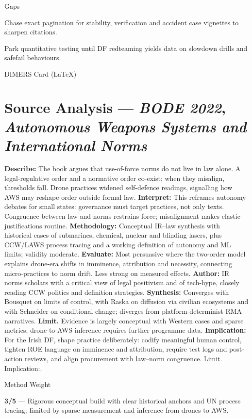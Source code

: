 Gaps

Chase exact pagination for stability, verification and accident case vignettes to sharpen citations.

Park quantitative testing until DF red\textendash teaming yields data on slow\textendash down drills and safe\textendash fail behaviours.

\parencite{BODE_2022}

DIMERS Card (LaTeX)

\section*{Source Analysis — \textit{BODE 2022}, \textit{Autonomous Weapons Systems and International Norms}}
\textbf{Describe:} The book argues that use-of-force norms do not live in law alone. A legal-regulative order and a normative order co-exist; when they misalign, thresholds fall. Drone practices widened self-defence readings, signalling how AWS may reshape order outside formal law.
\textbf{Interpret:} This reframes autonomy debates for small states: governance must target practices, not only texts. Congruence between law and norms restrains force; misalignment makes elastic justifications routine.
\textbf{Methodology:} Conceptual IR–law synthesis with historical cases of submarines, chemical, nuclear and blinding lasers, plus CCW/LAWS process tracing and a working definition of autonomy and ML limits; validity moderate.
\textbf{Evaluate:} Most persuasive where the two-order model explains drone-era shifts in imminence, attribution and necessity, connecting micro-practices to norm drift. Less strong on measured effects.
\textbf{Author:} IR norms scholars with a critical view of legal positivism and of tech-hype, closely reading CCW politics and definition strategies.
\textbf{Synthesis:} Converges with Bousquet on limits of control, with Raska on diffusion via civilian ecosystems and with Schneider on conditional change; diverges from platform-determinist RMA narratives.
\textbf{Limit.} Evidence is largely conceptual with Western cases and sparse metrics; drone-to-AWS inference requires further programme data.
\textbf{Implication:} For the Irish DF, shape practice deliberately: codify meaningful human control, tighten ROE language on imminence and attribution, require test logs and post-action reviews, and align procurement with law–norm congruence. Limit. Implication:.

Method Weight

\textbf{3/5} — Rigorous conceptual build with clear historical anchors and UN process tracing; limited by sparse measurement and inference from drones to AWS.

